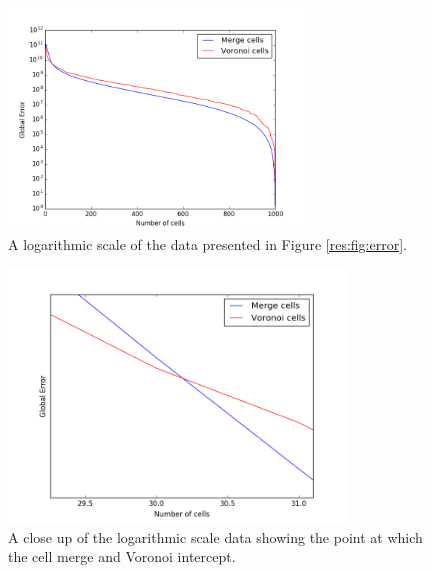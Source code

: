 \begin{figure}[H]
\centering
\includegraphics[width=0.7\textwidth]{Images/result_error_log.png}
\caption{A logarithmic scale of the data presented in Figure \ref{res:fig:error}.}
\label{res:fig:error_log}
\end{figure}
\begin{figure}[H]
\centering
\includegraphics[width=0.8\textwidth]{Images/result_error_log_zoom.png}
\caption{A close up of the logarithmic scale data showing the point at which the cell merge and Voronoi intercept.}
\label{res:fig:error_log_z}
\end{figure}